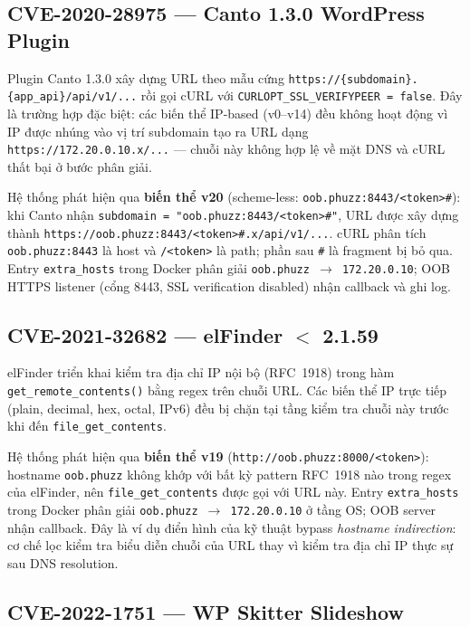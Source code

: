 \subsection{CVE-2020-28975 --- Canto 1.3.0 WordPress Plugin}

Plugin Canto 1.3.0 xây dựng URL theo mẫu cứng
\texttt{https://\{subdomain\}.\{app\_api\}/api/v1/...} rồi gọi cURL
với \texttt{CURLOPT\_SSL\_VERIFYPEER = false}. Đây là trường hợp đặc
biệt: các biến thể IP-based (v0--v14) đều không hoạt động vì IP được
nhúng vào vị trí subdomain tạo ra URL dạng
\texttt{https://172.20.0.10.x/...} --- chuỗi này không hợp lệ về mặt
DNS và cURL thất bại ở bước phân giải.

Hệ thống phát hiện qua \textbf{biến thể v20} (scheme-less:
\texttt{oob.phuzz:8443/<token>\#}): khi Canto nhận
\texttt{subdomain = "oob.phuzz:8443/<token>\#"}, URL được xây dựng
thành \texttt{https://oob.phuzz:8443/<token>\#.x/api/v1/...}. cURL
phân tích \texttt{oob.phuzz:8443} là host và \texttt{/<token>} là path;
phần sau \texttt{\#} là fragment bị bỏ qua. Entry \texttt{extra\_hosts}
trong Docker phân giải \texttt{oob.phuzz $\rightarrow$ 172.20.0.10}; OOB
HTTPS listener (cổng 8443, SSL verification disabled) nhận callback và
ghi log.

\subsection{CVE-2021-32682 --- elFinder $<$ 2.1.59}

elFinder triển khai kiểm tra địa chỉ IP nội bộ (RFC~1918) trong hàm
\texttt{get\_remote\_contents()} bằng regex trên chuỗi URL. Các biến
thể IP trực tiếp (plain, decimal, hex, octal, IPv6) đều bị chặn tại
tầng kiểm tra chuỗi này trước khi đến \texttt{file\_get\_contents}.

Hệ thống phát hiện qua \textbf{biến thể v19}
(\texttt{http://oob.phuzz:8000/<token>}): hostname \texttt{oob.phuzz}
không khớp với bất kỳ pattern RFC~1918 nào trong regex của elFinder,
nên \texttt{file\_get\_contents} được gọi với URL này. Entry
\texttt{extra\_hosts} trong Docker phân giải
\texttt{oob.phuzz $\rightarrow$ 172.20.0.10} ở tầng OS; OOB server nhận
callback. Đây là ví dụ điển hình của kỹ thuật bypass
\textit{hostname indirection}: cơ chế lọc kiểm tra biểu diễn chuỗi của
URL thay vì kiểm tra địa chỉ IP thực sự sau DNS resolution.

\subsection{CVE-2022-1751 --- WP Skitter Slideshow}

